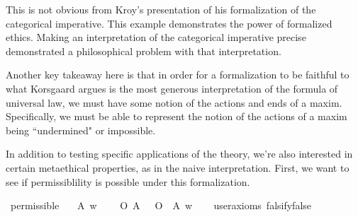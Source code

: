 \begin{isabellebody}
\begin{isamarkuptext}
        This is not obvious from Kroy's presentation of his formalization of 
        the categorical imperative. This example demonstrates the power of formalized ethics. Making
        an interpretation of the categorical imperative precise demonstrated a philosophical problem 
        with that interpretation.

        Another key takeaway here is that in order for a formalization to be faithful to what Korsgaard
        argues is the most generous interpretation of the formula of universal law, we must have some notion
        of the actions and ends of a maxim. Specifically, we must be able to represent the notion of the 
        actions of a maxim being ``undermined" or impossible.%
\end{isamarkuptext}\isamarkuptrue%
%
\isadelimdocument
%
\endisadelimdocument
%
\isatagdocument
%
\isamarkuptrue%
%
\endisatagdocument
{\isafolddocument}%
%
\isadelimdocument
%
\endisadelimdocument
%
\begin{isamarkuptext}%
In addition to testing specific applications of the theory, we're also interested in certain 
        metaethical properties, as in the naive interpretation. First, we want to see if permissiblility
        is possible under this formalization.%
\end{isamarkuptext}\isamarkuptrue%
\isamarkupfalse%
\ permissible{\isacharcolon}\isanewline
\ \ \ A\ w\isanewline
\ \ \ {\isachardoublequoteopen}{\isacharparenleft}{\isacharparenleft}\isactrlbold {\isasymnot}\ {\isacharparenleft}O\ {\isacharbraceleft}A{\isacharbraceright}{\isacharparenright}{\isacharparenright}\ \isactrlbold {\isasymand}\ {\isacharparenleft}\isactrlbold {\isasymnot}\ {\isacharparenleft}O\ {\isacharbraceleft}\isactrlbold {\isasymnot}\ A{\isacharbraceright}{\isacharparenright}{\isacharparenright}{\isacharparenright}\ w{\isachardoublequoteclose}\isanewline
\ \ \isamarkupfalse%
\ {\isacharbrackleft}user{\isacharunderscore}axioms{\isacharcomma}\ falsify{\isacharequal}false{\isacharbrackright}%
\isadelimproof
\ %
\endisadelimproof
%
\isatagproof
{}\isamarkupfalse%
\isanewline
%
\end{isabellebody}
